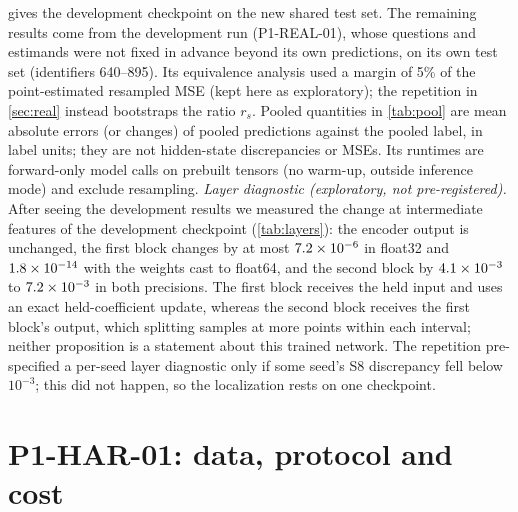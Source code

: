 \documentclass{article}
\theoremstyle{plain}
\theoremstyle{definition}
\theoremstyle{remark}
\begin{document}
 gives the development checkpoint on the new shared test set. The remaining results come from the development run (P1-REAL-01), whose questions and estimands were not fixed in advance beyond its own predictions, on its own test set (identifiers 640--895).
Its equivalence analysis used a margin of 5\% of the point-estimated resampled MSE (kept here as exploratory); the repetition in \cref{sec:real} instead bootstraps the ratio $r_s$.
Pooled quantities in \cref{tab:pool} are mean absolute errors (or changes) of pooled predictions against the pooled label, in label units; they are not hidden-state discrepancies or MSEs.
Its runtimes are forward-only model calls on prebuilt tensors (no warm-up, outside inference mode) and exclude resampling.
\emph{Layer diagnostic (exploratory, not pre-registered).} After seeing the development results we measured the change at intermediate features of the development checkpoint (\cref{tab:layers}): the encoder output is unchanged, the first block changes by at most $7.2\times10^{-6}$ in float32 and $1.8\times10^{-14}$ with the weights cast to float64, and the second block by $4.1\times10^{-3}$ to $7.2\times10^{-3}$ in both precisions. The first block receives the held input and uses an exact held-coefficient update, whereas the second block receives the first block's output, which splitting samples at more points within each interval; neither proposition is a statement about this trained network. The repetition pre-specified a per-seed layer diagnostic only if some seed's S8 discrepancy fell below $10^{-3}$; this did not happen, so the localization rests on one checkpoint.





\FloatBarrier
\section{P1-HAR-01: data, protocol and cost}
\label{app:har}
\end{document}
